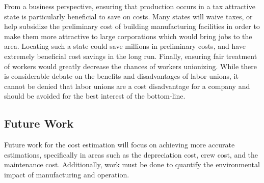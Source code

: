 From a business perspective, ensuring that production occurs in a tax attractive state is particularly beneficial to save on costs. Many states will waive taxes, or help subsidize the preliminary cost of building manufacturing facilities in order to make them more attractive to large corporations which would bring jobs to the area. Locating such a state could save millions in preliminary costs, and have extremely beneficial cost savings in the long run. Finally, ensuring fair treatment of workers would greatly decrease the chances of workers unionizing. While there is considerable debate on the benefits and disadvantages of labor unions, it cannot be denied that labor unions are a cost disadvantage for a company and should be avoided for the best interest of the bottom-line.

\subsection{Future Work}

Future work for the cost estimation will focus on achieving more accurate estimations, specifically in areas such as the depreciation cost, crew cost, and the maintenance cost. Additionally, work must be done to quantify the environmental impact of manufacturing and operation.


